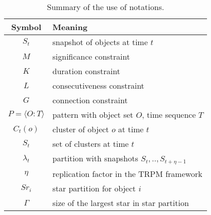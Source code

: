 \begin{table}[h]\scriptsize
\centering
\begin{tabular}{|c|l|} 
\hline
\textbf{Symbol} & \textbf{Meaning} \\
\hline
$S_t$ & snapshot of objects at time $t$ \\
\hline
$M$ & significance constraint \\
\hline 
$K$ & duration constraint\\
\hline
$L$ & consecutiveness constraint\\
\hline
$G$ & connection constraint \\
\hline
$P=\langle O:T \rangle$ & pattern with object set $O$, time sequence $T$\\
\hline
$C_t(o)$ & cluster of object $o$ at time $t$ \\
\hline 
$S_t$ & set of clusters at time $t$\\
\hline 
$\lambda_t$ & partition with snapshots $S_t,..,S_{t+\eta-1}$ \\\hline
$\eta$ & replication factor in the TRPM framework\\
\hline
$Sr_i $ &  star partition for object $i$ \\
\hline 
$\Gamma$ & size of the largest star in star partition \\
\hline
\end{tabular} 
\caption{Summary of the use of notations.}
\end{table}
